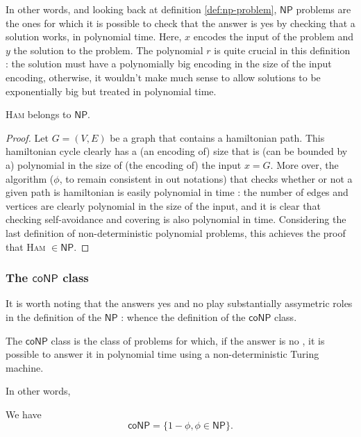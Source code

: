 In other words, and looking back at definition \ref{def:np-problem}, $ \mathsf{NP} $ problems are the ones for which it is possible to check that the answer is \og yes \fg by checking that a solution works, in polynomial time. Here, $ x $ encodes the input of the problem and $ y $ the solution to the problem. The polynomial $ r $ is quite crucial in this definition : the solution must have a polynomially big encoding in the size of the input encoding, otherwise, it wouldn't make much sense to allow solutions to be exponentially big but treated in polynomial time.

\begin{proposition}
    \textsc{Ham} belongs to $ \mathsf{NP} $.
\end{proposition}

\begin{proof}
    Let $ G = (V,E) $ be a graph that contains a hamiltonian path. This hamiltonian cycle clearly has a (an encoding of) \og size \fg that is (can be bounded by a) polynomial in the size of (the encoding of) the input $ x = G $. More over, the algorithm ($ \phi $, to remain consistent in out notations) that checks whether or not a given path is hamiltonian is easily polynomial in time : the number of edges and vertices are clearly polynomial in the size of the input, and it is clear that checking self-avoidance and covering is also polynomial in time. Considering the last definition of non-deterministic polynomial problems, this achieves the proof that \textsc{Ham} $ \in \mathsf{NP} $.
\end{proof}

\subsubsection{The $ \mathsf{coNP} $ class}

It is worth noting that the answers \og yes \fg and \og no \fg play substantially assymetric roles in the definition of the $ \mathsf{NP} $ : whence the definition of the $ \mathsf{coNP} $ class.

\begin{definition}
     The $ \mathsf{coNP} $ class is the class of problems for which, if the answer is \og no \fg, it is possible to answer it in polynomial time using a non-deterministic Turing machine.
\end{definition}

In other words, 

\begin{proposition}
    We have 
    \[
        \mathsf{coNP} = \{ 1 - \phi, \phi \in \mathsf{NP} \}.
    \]
\end{proposition}

